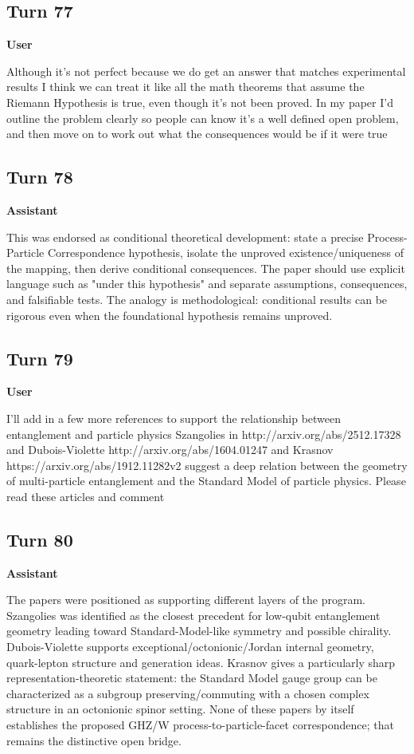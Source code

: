 \documentclass[11pt,a4paper]{article}
\newcommand{\speaker}[1]{\par\medskip\noindent\textbf{\large #1}\par\smallskip}
\begin{document}
\subsection*{Turn 77}
\speaker{User}
Although it's not perfect because we do get an answer that matches experimental results I think we can treat it like all the math theorems that assume the Riemann Hypothesis is true, even though it's not been proved. In my paper I'd outline the problem clearly so people can know it's a well defined open problem, and then move on to work out what the consequences would be if it were true
\subsection*{Turn 78}
\speaker{Assistant}
This was endorsed as conditional theoretical development: state a precise Process-Particle Correspondence hypothesis, isolate the unproved existence/uniqueness of the mapping, then derive conditional consequences. The paper should use explicit language such as "under this hypothesis" and separate assumptions, consequences, and falsifiable tests. The analogy is methodological: conditional results can be rigorous even when the foundational hypothesis remains unproved.
\subsection*{Turn 79}
\speaker{User}
I'll add in a few more references to support the relationship between entanglement and particle physics Szangolies in http://arxiv.org/abs/2512.17328 and Dubois-Violette http://arxiv.org/abs/1604.01247 and Krasnov https://arxiv.org/abs/1912.11282v2 suggest a deep relation between the geometry of multi-particle entanglement and the Standard Model of particle physics. Please read these articles and comment
\subsection*{Turn 80}
\speaker{Assistant}
The papers were positioned as supporting different layers of the program. Szangolies was identified as the closest precedent for low-qubit entanglement geometry leading toward Standard-Model-like symmetry and possible chirality. Dubois-Violette supports exceptional/octonionic/Jordan internal geometry, quark-lepton structure and generation ideas. Krasnov gives a particularly sharp representation-theoretic statement: the Standard Model gauge group can be characterized as a subgroup preserving/commuting with a chosen complex structure in an octonionic spinor setting. None of these papers by itself establishes the proposed GHZ/W process-to-particle-facet correspondence; that remains the distinctive open bridge.
\end{document}

